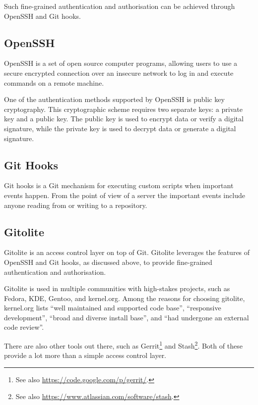 Such fine-grained authentication and authorisation can be achieved through
OpenSSH and Git hooks.

\subsection{OpenSSH}

OpenSSH is a set of open source computer programs, allowing users to use a
secure encrypted connection over an insecure network to log in and execute
commands on a remote machine.

One of the authentication methods supported by OpenSSH is public key
cryptography. This cryptographic scheme requires two separate keys: a private
key and a public key. The public key is used to encrypt data or verify a
digital signature, while the private key is used to decrypt data or generate a
digital signature.

\subsection{Git Hooks}

Git hooks is a Git mechanism for executing custom scripts when important events
happen. From the point of view of a server the important events include anyone
reading from or writing to a repository.

\subsection{Gitolite}

Gitolite is an access control layer on top of Git\cite{gitolite-com-2014a}.
Gitolite leverages the features of OpenSSH and Git hooks, as discussed above,
to provide fine-grained authentication and
authorisation\cite{gitolite-com-2014b}.

Gitolite is used in multiple communities with high-stakes projects, such as
Fedora, KDE, Gentoo, and kernel.org\cite{gitolite-com-2014c}. Among the reasons
for choosing gitolite, kernel.org lists\cite{kernel-org-2014} ``well maintained
and supported code base'', ``responsive development'', ``broad and diverse
install base'', and ``had undergone an external code
review''\cite{gitolite-google-group-2011}.

There are also other tools out there, such as  Gerrit\footnote{See also
\url{https://code.google.com/p/gerrit/}.} and Stash\footnote{See also
\url{https://www.atlassian.com/software/stash}.}. Both of these provide a lot
more than a simple access control layer.

